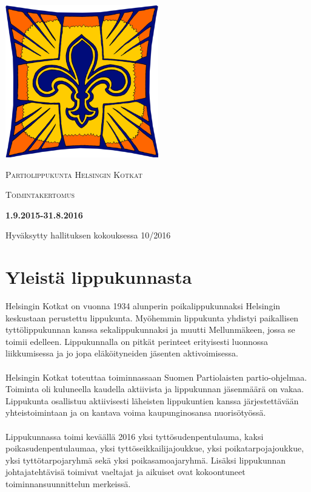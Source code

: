 \documentclass[a4paper, 12pt, finnish]{report} %
\begin{document}
\begin{titlepage}
	\centering
	\includegraphics[width=0.5\textwidth]{heko.png}\par\vspace{1cm}
	{\scshape\LARGE Partiolippukunta Helsingin Kotkat \par}
	\vspace{1cm}
	{\scshape\Large Toimintakertomus\par}
	\vspace{1.5cm}
	{\huge\bfseries 1.9.2015-31.8.2016\par}
	\vspace{2cm}
	\vfill
	\vfill
	{\large Hyväksytty hallituksen kokouksessa 10/2016}
\end{titlepage}

\section{Yleistä lippukunnasta}
Helsingin Kotkat on vuonna 1934 alunperin poikalippukunnaksi Helsingin keskustaan perustettu lippukunta. Myöhemmin lippukunta yhdistyi paikallisen tyttölippukunnan kanssa sekalippukunnaksi ja muutti Mellunmäkeen, jossa se toimii edelleen. Lippukunnalla on pitkät perinteet erityisesti luonnossa liikkumisessa ja jo jopa eläköityneiden jäsenten aktivoimisessa.\\
\\Helsingin Kotkat toteuttaa toiminnassaan Suomen Partiolaisten partio-ohjelmaa. Toiminta oli kuluneella kaudella aktiivista ja lippukunnan jäsenmäärä on vakaa. Lippukunta osallistuu aktiivisesti läheisten lippukuntien kanssa järjestettävään yhteistoimintaan ja on kantava voima kaupunginosansa nuorisötyössä.\\
\\Lippukunnassa toimi keväällä 2016 yksi tyttösudenpentulauma, kaksi poikasudenpentulaumaa, yksi tyttöseikkailijajoukkue, yksi poikatarpojajoukkue, yksi tyttötarpojaryhmä sekä yksi poikasamoajaryhmä. Lisäksi lippukunnan johtajatehtävisä toimivat vaeltajat ja aikuiset ovat kokoontuneet toiminnansuunnittelun merkeissä.
\newpage
\end{document}
